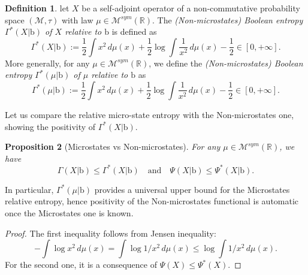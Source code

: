 \documentclass[10pt, reqno]{amsart}
\numberwithin{equation}{section}
\theoremstyle{definition}
\newtheorem{definition}{Definition}[section]
\theoremstyle{plain}
\newtheorem{proposition}[definition]{Proposition}
\theoremstyle{remark}
\newcommand{\R}{\mathbb{R}}
\newcommand{\1}{\mathbbm{1}}
\begin{document}
 \begin{definition}
let $X$ be a self-adjoint operator of a non-commutative probability space $(\mathcal{M},\tau)$ with law $\mu\in\mathcal{M}^{sym}(\R)$. The \textit{(Non-microstates) Boolean entropy $\Gamma^*(X|\mathbb{\mathrm{b}})$ of $X$ relative to $\mathbb{\mathrm{b}}$}  is defined as
\begin{equation}\label{entropy*}
		\Gamma^*(X|\mathbb{\mathrm{b}}):=\frac{1}{2}\int x^2 \,d\mu(x)  +\frac{1}{2}\log\int \frac{1}{x^2}\,d\mu(x)-\frac{1}{2}\in [0,+\infty].
	\end{equation}
    More generally, for any $\mu \in\mathcal{M}^{sym}(\R)$, we define the \textit{(Non-microstates) Boolean entropy $\Gamma^*(\mu|\mathbb{\mathrm{b}})$ of $\mu$ relative to $\mathbb{\mathrm{b}}$}   as
\begin{equation*}
		\Gamma^*(\mu|\mathbb{\mathrm{b}}):=\frac{1}{2}\int x^2 \,d\mu(x)  +\frac{1}{2}\log \int \frac{1}{x^2}\,d\mu(x)-\frac{1}{2}\in [0,+\infty].
	\end{equation*}
\end{definition}

Let us compare the relative micro-state entropy with the Non-microstates one, showing the positivity of $\Gamma^*(X|\mathbb{\mathrm{b}})$.
    \begin{proposition}[Microstates  vs Non-microstates]\label{thm:micro-nonmicro}
	For any $\mu\in\mathcal{M}^{sym}(\R)$, we have
	\begin{equation*}
		\Gamma(X|\mathbb{\mathrm{b}})\leq \Gamma^*(X|\mathbb{\mathrm{b}})
\ \ \ \text{ and }\ \ \ 
\Psi(X|\mathbb{\mathrm{b}})\leq \Psi^*(X|\mathbb{\mathrm{b}}).
	\end{equation*}
	\end{proposition}
In particular, $\Gamma^*(\mu|\mathbb{\mathrm{b}})$ provides a universal upper bound
for the Microstates relative entropy, hence positivity of the Non-microstates
functional is automatic once the Microstates one is known.
\begin{proof}
        The first inequality follows from Jensen inequality:
        $$-\int\log x^2\,d\mu(x) =\int\log 1/x^2\,d\mu(x) \leq \log \int 1/x^2\,d\mu(x).$$
For the second one, it is a consequence of $\Psi(X)\leq \Psi^*(X)$.
    \end{proof}
    
\end{document}

